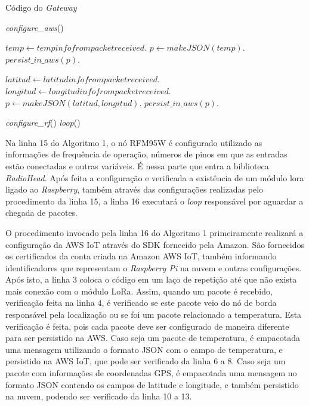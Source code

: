 \documentclass[
    hidelinks,
	12pt,				%
	openany,
	oneside, 
	a4paper,			%
	english,			%
	french,				%
	spanish,			%
	brazil				%
	]{abntex2}
\begin{document}
\begin{algorithm}
\caption{Código do \textit{Gateway}}\label{gateway-code}
\begin{algorithmic}[1]
\State \textit{configure\_aws}()

\State $temp \gets temp info from packet received$.
\State $p \gets \textit{makeJSON}(temp)$.
\State $\textit{persist\_in\_aws}(p)$.
\EndIf

\State $latitud \gets latitud info from packet received$.
\State $longitud \gets longitud info from packet received$.
\State $p \gets \textit{makeJSON}(latitud, longitud)$.
\State $\textit{persist\_in\_aws}(p)$.
\EndIf

\EndIf
\EndWhile
\EndProcedure

\State \textit{configure\_rf}()
\State \textit{loop}()
\EndProcedure
\end{algorithmic}
\end{algorithm}

Na linha 15 do Algoritmo 1, o nó RFM95W é configurado utilizado as informações de frequência de operação, números de pinos em que as entradas estão conectadas e outras variáveis. É nessa parte que entra a biblioteca \textit{RadioHead}. Após feita a configuração e verificada a existência de um módulo lora ligado ao \textit{Raspberry}, também através das configurações realizadas pelo procedimento da linha 15, a linha 16 executará o \textit{loop} responsável por aguardar a chegada de pacotes. 

O procedimento invocado pela linha 16 do Algoritmo 1 primeiramente realizará a configuração da AWS IoT através do SDK fornecido pela Amazon. São fornecidos os certificados da conta criada na Amazon AWS IoT, também informando identificadores que representam o \textit{Raspberry Pi} na nuvem e outras configurações. Após isto, a linha 3 coloca o código em um laço de repetição até que não exista mais conexão com o módulo LoRa. Assim, quando um pacote é recebido, verificação feita na linha 4, é verificado se este pacote veio do nó de borda responsável pela localização ou se foi um pacote relacionado a temperatura. Esta verificação é feita, pois cada pacote deve ser configurado de maneira diferente para ser persistido na AWS. Caso seja um pacote de temperatura, é empacotada uma mensagem utilizando o formato JSON com o campo de temperatura, e persistido na AWS IoT, que pode ser verificado da linha 6 a 8. Caso seja um pacote com informações de coordenadas GPS, é empacotada uma mensagem no formato JSON contendo os campos de latitude e longitude, e também persistido na nuvem, podendo ser verificado da linha 10 a 13. 
\end{document}
